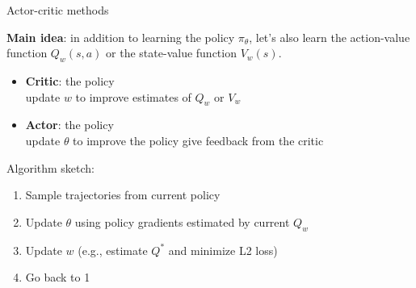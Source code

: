 \documentclass[usenames,dvipsnames,notes,11pt,aspectratio=169,hyperref={colorlinks=true, linkcolor=blue}]{beamer}
\begin{document}
\begin{frame}
    {Actor-critic methods}

    {\bf Main idea}: in addition to learning the policy $\pi_\theta$, let's also learn the action-value function $Q_w(s, a)$ or the state-value function $V_w(s)$.

    \pause
    \begin{itemize}
        \item {\bf Critic}:  the policy\\
            update $w$ to improve estimates of $Q_w$ or $V_w$\\
        \item {\bf Actor}:  the policy\\
            update $\theta$ to improve the policy give feedback from the critic
    \end{itemize}

    \pause
    Algorithm sketch:\\
    \begin{enumerate}
        \item Sample trajectories from current policy
        \item Update $\theta$ using policy gradients estimated by current $Q_w$
        \item Update $w$ (e.g., estimate $Q^*$ and minimize L2 loss)
        \item Go back to 1
    \end{enumerate}
\end{frame}
\end{document}
